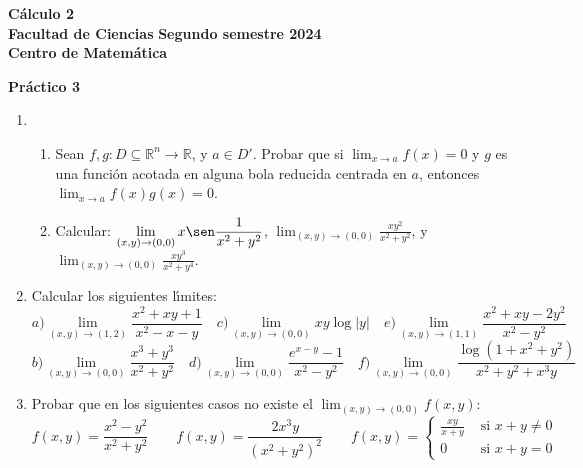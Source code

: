 \documentclass[11pt]{article}
\newcommand{\R}{\mathbb{R}}
\begin{document}
 \hfill {\bf C\'{a}lculo 2} \\
{\bf Facultad de Ciencias} \hfill {\bf Segundo semestre 2024} \\
{\bf Centro de Matem\'{a}tica} 

\vspace{1cm}

\begin{center}
{\bf Pr\'{a}ctico 3 }
\end{center}

\vspace{0,1cm}

\begin{enumerate}

\item \begin{enumerate}


       \item Sean $f,g:D\subseteq\R^n\rightarrow\R$, y $a\in
         D'$. Probar que si $\lim_{x\rightarrow a}f(x)=0$ y $g$ es una 
         funci\'on acotada en alguna bola reducida centrada en $a$,
         entonces $\lim_{x\to a}f(x)g(x)=0$.  
       \item Calcular: $\displaystyle{\lim_{(x,y)\to (0,0)} x\sen
           \frac{1}{x^2 +y^2 }}$, 
         $\displaystyle{\lim_{(x,y)\to (0,0)}\frac{xy^{2}}{x^2
             +y^2}}$, y 
         $\displaystyle{\lim_{(x,y)\to (0,0)} %
         \frac{xy^{3}}{x^2 +y^4}}.$
      \end{enumerate}
       
\item\label{bonus4-1} Calcular los siguientes l\'\i mites:
      \[ a\textrm{)}\lim_{(x,y)\to (1,2)}\frac {x^2 +xy+1}{x^2 -x-y} \quad 
         c\textrm{)}\lim_{(x,y)\to (0,0)}xy\log|y| \quad
         e\textrm{)}\lim_{(x,y)\to (1,1)}\frac{x^2 +xy-2y^2 }{x^2-y^2}\] 
      \[ b\textrm{)}\lim_{(x,y)\to (0,0)}\frac{x^3 +y^3 }{x^2 +y^2} \quad 
         d\textrm{)}\lim_{(x,y)\to (0,0)}\frac{e^{x-y}-1 }{x^2 -y^2} \quad
         f\textrm{)}\lim_{(x,y)\to (0,0)}\frac{\log(1+x^2 +y^2) }{x^2 +y^2 +
           x^{3}y}\] 
\item Probar que en los siguientes casos no existe el
      $\lim_{(x,y)\rightarrow (0,0)} f(x,y)$: 
      \[ f(x,y)=\frac{x^2 -y^2}{x^2 +y^2} \qquad
      f(x,y)=\frac{2x^{3}y}{(x^{2}+y^{2})^{2}}  \qquad f(x,y)=\left\{  
      \begin{array}{ll} \frac{xy}{x+y} & \textrm{ si }x+y\neq 0 \\ 0
        &\textrm{ si }
        x+y=0  \end{array} \right. \]


\end{enumerate}
\end{document}
